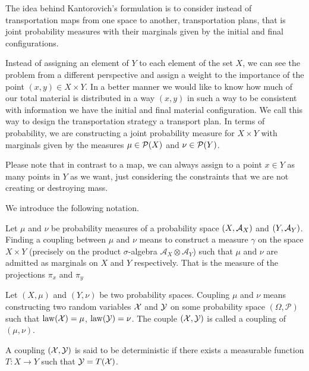 The idea behind Kantorovich's formulation is to consider instead of transportation maps from one space to another, transportation plans, that is joint probability measures with their marginals given by the initial and final configurations.

Instead of assigning an element of $Y$ to each element of the set $X$, we can see the problem from a different perspective and assign a weight to the importance of the point $\left(x, y\right)\in X\times Y$. In a better manner we would like to know how much of our total material is distributed in a way $(x, y)$ in such a way to be consistent with information we have the initial and final material configuration. We call this way to design the transportation strategy a transport plan. In terms of probability, we are constructing a joint probability measure for $X\times Y$ with marginals given by the measures $\mu \in \mathcal{P}(X)$ and $\nu \in \mathcal{P}(Y)$.

Please note that in contrast to a map, we can always assign to a point $x\in Y$ as many points in $Y$ as we want, just considering the constraints that we are not creating or destroying mass. 


We introduce the following notation. 

\begin{definition}[Coupling]
Let $\mu$ and $\nu$ be probability measures of a probability space $\left( X, \mathcal{A}_X \right)$ and $\left( Y, \mathcal{A}_Y \right)$. Finding a coupling between $\mu$ and $\nu$ means to construct a measure $\gamma$ on the space $X\times Y$ (precisely on the product $\sigma$-algebra $\mathcal{A}_X\otimes\mathcal{A}_Y$) such that $\mu$ and $\nu$ are admitted as marginals on $X$ and $Y$ respectively. That is the measure of the projections $\pi_x$ and $\pi_y$
\end{definition}
 
 Let $(X, \mu)$ and $(Y, \nu)$ be two probability spaces. Coupling $\mu$ and $\nu$ means constructing two random variables $\mathcal{X}$ and $\mathcal{Y}$ on some probability space $(\Omega, \mathcal{P})$ such that $\mathrm{law}(\mathcal{X})=\mu$, $\mathrm{law}(\mathcal{Y})=\nu$. The couple $(\mathcal{X},\mathcal{Y})$ is called a coupling of $(\mu, \nu)$.  
 
\begin{definition}
A coupling $(\mathcal{X},\mathcal{Y})$ is said to be deterministic if there exists a measurable function $T: X \rightarrow Y$ such that $\mathcal{Y} = T(\mathcal{X})$.
\end{definition}

